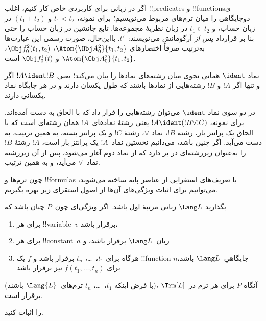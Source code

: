 \documentclass[../../../include/open-logic-section]{subfiles}
\begin{document}
اگر در زبانی برای کاربردی خاص کار کنیم، اغلب !!{predicate}s و !!{function}sی
دوجایگاهی را میان ترم‌های مربوط می‌نویسیم؛ برای نمونه، $t_1 < t_2$ و
$(t_1 + t_2)$ در زبان حساب، و $t_1 \in t_2$ در زبان نظریهٔ مجموعه‌ها.
تابع جانشین در زبان حساب را حتی بنا بر قرارداد \emph{پس از} آرگومانش
می‌نویسند:~$t'$. بااین‌حال، صورت رسمی این عبارت‌ها به‌ترتیب صرفاً
اختصارهای $\Atom{\Obj A^2_0}{t_1, t_2}$، $\Obj f^2_0(t_1, t_2)$،
$\Atom{\Obj A^2_0}{t_1, t_2}$ و $\Obj f^1_0(t)$ است.

\begin{defn}
نماد $\ident$ همانی نحوی میان رشته‌های نمادها را بیان می‌کند؛ یعنی
$!A \ident !B$ اگر و تنها اگر $!A$ و $!B$ رشته‌هایی از نمادها باشند که
طول یکسان دارند و در هر جایگاه نماد یکسانی دارند.
\end{defn}

در دو سوی نماد $\ident$ می‌توان رشته‌هایی را قرار داد که با الحاق به دست
آمده‌اند. برای نمونه، $!A \ident (!B \lor !C)$ یعنی رشتهٔ نمادهای~$!A$
همان رشته‌ای است که با الحاق یک پرانتز باز، رشتهٔ $!B$، نماد $\lor$، رشتهٔ
$!C$ و یک پرانتز بسته، به همین ترتیب، به دست می‌آید. اگر چنین باشد، می‌دانیم
نخستین نماد~$!A$ یک پرانتز باز است، $!A$ رشتهٔ $!B$ را به‌عنوان زیررشته‌ای
در بر دارد که از نماد دوم آغاز می‌شود، پس از آن زیررشته نماد~$\lor$ می‌آید،
و به همین ترتیب.

چون ترم‌ها و !!{formula}s با تعریف‌های استقرایی از عناصر پایه ساخته
می‌شوند، می‌توانیم برای اثبات ویژگی‌های آن‌ها از اصول استقرای زیر بهره
بگیریم.

\begin{lem}
    بگذارید $\Lang L$ زبانی مرتبهٔ اول باشد.
    اگر ویژگی‌ای چون~$P$ چنان باشد که
    \begin{enumerate}
        \item برای هر !!{variable}~$v$ برقرار باشد،
        \item برای هر !!{constant}~$a$ زبان~$\Lang L$ برقرار باشد، و
        \item هرگاه برای $t_1$،~\dots، $t_n$ برقرار باشد و $f$ یک
            !!{function} $n$جایگاهیِ~$\Lang L$ باشد، برای
            $f(t_1,\dotsc,t_n)$ نیز برقرار باشد
    \end{enumerate}
    (با فرض اینکه $t_1$،~\dots، $t_n$ ترم‌های~$\Lang{L}$ باشند)،
    آنگاه $P$ برای هر ترم در~$\Trm[L]$ برقرار است.
\end{lem}

\begin{prob}
     را اثبات کنید.
\end{prob}
\end{document}
